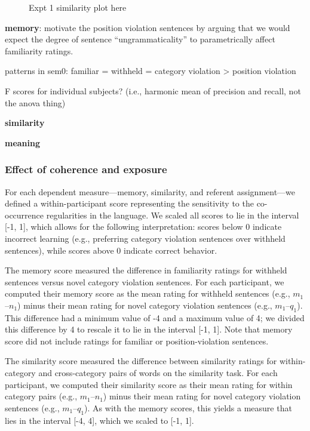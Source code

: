 \documentclass[man,floatsintext]{apa6}
\begin{document}
\begin{figure}[t]
  \begin{center} 
    \caption{Expt 1 similarity plot here}
    \label{x1-descriptive-sim}
  \end{center}
\end{figure}

\textbf{memory}: motivate the position violation sentences by arguing that we would expect the degree of sentence ``ungrammaticality'' to parametrically affect familiarity ratings.

patterns in sem0: familiar = withheld = category violation > position violation

F scores for individual subjects? (i.e., harmonic mean of precision and recall, not the anova thing)

\textbf{similarity}


\textbf{meaning}

\subsubsection{Effect of coherence and exposure}

For each dependent measure---memory, similarity, and referent assignment---we defined a within-participant score representing the sensitivity to the co-occurrence regularities in the language. We scaled all scores to lie in the interval [-1, 1], which allows for the following interpretation: scores below 0 indicate incorrect learning (e.g., preferring category violation sentences over withheld sentences), while scores above 0 indicate correct behavior.

The memory score measured the difference in familiarity ratings for withheld sentences versus novel category violation sentences. For each participant, we computed their memory score as the mean rating for withheld sentences (e.g., $m_1$--$n_1$) minus their mean rating for novel category violation sentences (e.g., $m_1$--$q_1$). This difference had a minimum value of -4 and a maximum value of 4; we divided this difference by 4 to rescale it to lie in the interval [-1, 1]. Note that memory score did not include ratings for familiar or position-violation sentences.

The similarity score measured the difference between similarity ratings for within-category and cross-category pairs of words on the similarity task. For each participant, we computed their similarity score as their mean rating for within category pairs (e.g., $m_1$--$n_1$) minus their mean rating for novel category violation sentences (e.g., $m_1$--$q_1$). As with the memory scores, this yields a measure that lies in the interval [-4, 4], which we scaled to [-1, 1].
\end{document}
